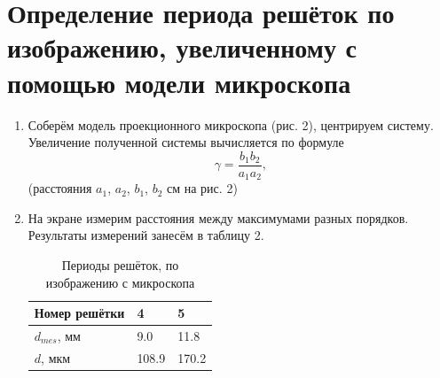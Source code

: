 \documentclass[12pt]{article}
\begin{document}
\section{Определение периода решёток по изображению, увеличенному
с помощью модели микроскопа}
\begin{enumerate}
    \item Соберём модель проекционного микроскопа (рис. 2), центрируем систему. Увеличение полученной системы вычисляется по формуле
    \begin{equation}
        \gamma = \frac{b_1 b_2}{a_1 a_2},
    \end{equation}
    (расстояния $a_1$, $a_2$, $b_1$, $b_2$ см на рис. 2)
    \item На экране измерим расстояния между максимумами разных порядков. Результаты измерений занесём в таблицу 2.
    
        \begin{table}[h]
    \centering
    \begin{center}
    \caption{Периоды решёток, по изображению с микроскопа}
    \end{center}
    \vspace{0.1cm}
    \label{tab:my_label}
    \begin{tabular}{ |p{3 cm}||p{1cm}|p{1cm}|}
 \hline
Номер решётки & 4 & 5\\
 \hline
 $d_{mes}$, мм & 9.0 & 11.8 \\
 \hline
 $d$, мкм & 108.9 & 170.2 \\

 \hline
 
\end{tabular}
\end{table}

\end{enumerate}
\end{document}
